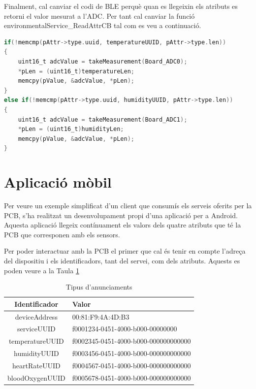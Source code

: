Finalment, cal canviar el codi de BLE perquè quan es llegeixin els atributs es retorni el valor mesurat a l'ADC.
Per tant cal canviar la funció environmentalService\_ReadAttrCB tal com es veu a continuació.

\begin{lstlisting}[language=C]
  if(!memcmp(pAttr->type.uuid, temperatureUUID, pAttr->type.len))
{
	uint16_t adcValue = takeMeasurement(Board_ADC0);
	*pLen = (uint16_t)temperatureLen;
	memcpy(pValue, &adcValue, *pLen);
}
else if(!memcmp(pAttr->type.uuid, humidityUUID, pAttr->type.len))
{
	uint16_t adcValue = takeMeasurement(Board_ADC1);
	*pLen = (uint16_t)humidityLen;
	memcpy(pValue, &adcValue, *pLen);
}
\end{lstlisting}


\section{Aplicació mòbil}
Per veure un exemple simplificat d'un client que consumís els serveis oferits per la PCB, s'ha realitzat un desenvolupament propi d'una aplicació per a Android.
Aquesta aplicació llegeix contínuament els valors dels quatre atributs que té la PCB que corresponen amb els sensors.

Per poder interactuar amb la PCB el primer que cal és tenir en compte l'adreça del dispositiu i els identificadors, tant del servei, com dels atributs.
Aquests es poden veure a la Taula \ref{taula_app}

\begin{table}[!h]
	\begin{center}
		\begin{tabular}{|c|l|}
			\hline
			Identificador	&	Valor	\\	\hline
			deviceAddress	&	00:81:F9:4A:4D:B3	\\	\hline
			serviceUUID		&	f0001234-0451-4000-b000-00000000		\\	\hline
			temperatureUUID	&	f0002345-0451-4000-b000-000000000000	\\	\hline
			humidityUUID	&	f0003456-0451-4000-b000-000000000000	\\	\hline
			heartRateUUID	&	f0004567-0451-4000-b000-000000000000	\\	\hline
			bloodOxygenUUID	&	f0005678-0451-4000-b000-000000000000	\\	\hline
		\end{tabular}
		\label{taula_app}
	\end{center}
	\caption{Tipus d'anunciaments}
\end{table}

